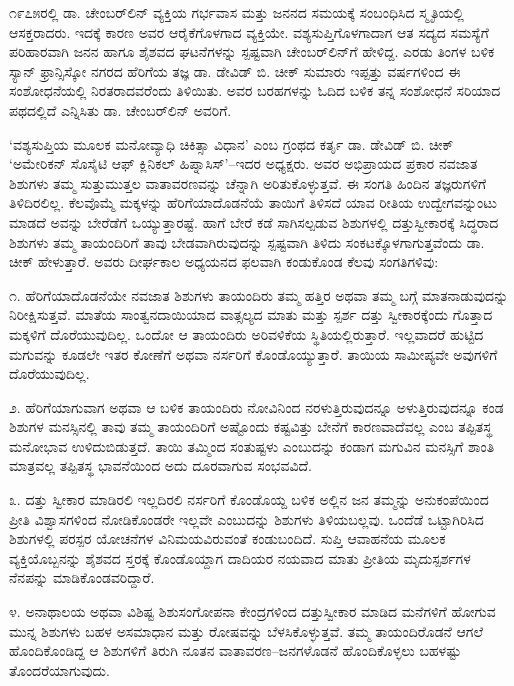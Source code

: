 ೧೯೭೫ರಲ್ಲಿ ಡಾ. ಚೇಂಬರ್​ಲಿನ್ ವ್ಯಕ್ತಿಯ ಗರ್ಭವಾಸ ಮತ್ತು ಜನನದ ಸಮಯಕ್ಕೆ ಸಂಬಂಧಿಸಿದ ಸ್ಮೃತಿಯಲ್ಲಿ ಆಸಕ್ತರಾದರು. ಇದಕ್ಕೆ ಕಾರಣ ಅವರ ಆರೈಕೆಗೊಳಗಾದ ವ್ಯಕ್ತಿಯೇ. ವಶ್ಯಸುಪ್ತಿಗೊಳಗಾದಾಗ ಆತ ಸದ್ಯದ ಸಮಸ್ಯೆಗೆ ಪರಿಹಾರವಾಗಿ ಜನನ ಹಾಗೂ ಶೈಶವದ ಘಟನೆಗಳನ್ನು ಸ್ಪಷ್ಟವಾಗಿ ಚೇಂಬರ್​ಲಿನ್​ಗೆ ಹೇಳಿದ್ದ. ಎರಡು ತಿಂಗಳ ಬಳಿಕ ಸ್ಯಾನ್ ಫ್ರಾನ್ಸಿಸ್ಕೋ ನಗರದ ಹೆರಿಗೆಯ ತಜ್ಞ ಡಾ. ಡೇವಿಡ್ ಬಿ. ಚೀಕ್ ಸುಮಾರು ಇಪ್ಪತ್ತು ವರ್ಷಗಳಿಂದ ಈ ಸಂಶೋಧನೆಯಲ್ಲಿ ನಿರತರಾದವರೆಂದು ತಿಳಿಯಿತು. ಅವರ ಬರಹಗಳನ್ನು ಓದಿದ ಬಳಿಕ ತನ್ನ ಸಂಶೋಧನೆ ಸರಿಯಾದ ಪಥದಲ್ಲಿದೆ ಎನ್ನಿಸಿತು ಡಾ. ಚೇಂಬರ್​ಲಿನ್ ಅವರಿಗೆ.

‘ವಶ್ಯಸುಪ್ತಿಯ ಮೂಲಕ ಮನೋವ್ಯಾಧಿ ಚಿಕಿತ್ಸಾ ವಿಧಾನ’ ಎಂಬ ಗ್ರಂಥದ ಕರ್ತೃ ಡಾ. ಡೇವಿಡ್ ಬಿ. ಚೀಕ್ ‘ಅಮೇರಿಕನ್ ಸೊಸೈಟಿ ಆಫ್ ಕ್ಲಿನಿಕಲ್ ಹಿಪ್ನಾಸಿಸ್​’–ಇದರ ಅಧ್ಯಕ್ಷರು. ಅವರ ಅಭಿಪ್ರಾಯದ ಪ್ರಕಾರ ನವಜಾತ ಶಿಶುಗಳು ತಮ್ಮ ಸುತ್ತುಮುತ್ತಲ ವಾತಾವರಣವನ್ನು ಚೆನ್ನಾಗಿ ಅರಿತುಕೊಳ್ಳುತ್ತವೆ. ಈ ಸಂಗತಿ ಹಿಂದಿನ ತಜ್ಞರುಗಳಿಗೆ ತಿಳಿದಿರಲಿಲ್ಲ. ಕೆಲವೊಮ್ಮೆ ಮಕ್ಕಳನ್ನು ಹೆರಿಗೆಯಾದೊಡನೆಯೆ ತಾಯಿಗೆ ತಿಳಿಸದೆ ಯಾವ ರೀತಿಯ ಉದ್ವೇಗವನ್ನುಂಟು ಮಾಡದೆ ಅವನ್ನು ಬೇರೆಡೆಗೆ ಒಯ್ಯುತ್ತಾರಷ್ಟೆ. ಹಾಗೆ ಬೇರೆ ಕಡೆ ಸಾಗಿಸಲ್ಪಡುವ ಶಿಶುಗಳಲ್ಲಿ ದತ್ತುಸ್ವೀಕಾರಕ್ಕೆ ಸಿದ್ಧರಾದ ಶಿಶುಗಳು ತಮ್ಮ ತಾಯಂದಿರಿಗೆ ತಾವು ಬೇಡವಾಗಿರುವುದನ್ನು ಸ್ಪಷ್ಟವಾಗಿ ತಿಳಿದು ಸಂಕಟಕ್ಕೊಳಗಾಗುತ್ತವೆಂದು ಡಾ. ಚೀಕ್ ಹೇಳುತ್ತಾರೆ. ಅವರು ದೀರ್ಘಕಾಲ ಅಧ್ಯಯನದ ಫಲವಾಗಿ ಕಂಡುಕೊಂಡ ಕೆಲವು ಸಂಗತಿಗಳಿವು:

೧. ಹೆರಿಗೆಯಾದೊಡನೆಯೇ ನವಜಾತ ಶಿಶುಗಳು ತಾಯಂದಿರು ತಮ್ಮ ಹತ್ತಿರ ಅಥವಾ ತಮ್ಮ ಬಗ್ಗೆ ಮಾತನಾಡುವುದನ್ನು ನಿರೀಕ್ಷಿಸುತ್ತವೆ. ಮಾತೆಯ ಸಾಂತ್ವನದಾಯಿಯಾದ ವಾತ್ಸಲ್ಯದ ಮಾತು ಮತ್ತು ಸ್ಪರ್ಶ ದತ್ತು ಸ್ವೀಕಾರಕ್ಕೆಂದು ಗೊತ್ತಾದ ಮಕ್ಕಳಿಗೆ ದೊರೆಯುವುದಿಲ್ಲ. ಒಂದೋ ಆ ತಾಯಂದಿರು ಅರಿವಳಿಕೆಯ ಸ್ಥಿತಿಯಲ್ಲಿರುತ್ತಾರೆ. ಇಲ್ಲವಾದರೆ ಹುಟ್ಟಿದ ಮಗುವನ್ನು ಕೂಡಲೇ ಇತರ ಕೋಣೆಗೆ ಅಥವಾ ನರ್ಸರಿಗೆ ಕೊಂಡೊಯ್ಯುತ್ತಾರೆ. ತಾಯಿಯ ಸಾಮೀಪ್ಯವೇ ಅವುಗಳಿಗೆ ದೊರೆಯುವುದಿಲ್ಲ.

೨. ಹೆರಿಗೆಯಾಗುವಾಗ ಅಥವಾ ಆ ಬಳಿಕ ತಾಯಂದಿರು ನೋವಿನಿಂದ ನರಳುತ್ತಿರುವುದನ್ನೂ ಅಳುತ್ತಿರುವುದನ್ನೂ ಕಂಡ ಶಿಶುಗಳ ಮನಸ್ಸಿನಲ್ಲಿ ತಾವು ತಮ್ಮ ತಾಯಂದಿರಿಗೆ ಅಷ್ಟೊಂದು ಕಷ್ಟವಿತ್ತು ಬೇನೆಗೆ ಕಾರಣವಾದೆವಲ್ಲ ಎಂಬ ತಪ್ಪಿತಸ್ಥ ಮನೋಭಾವ ಉಳಿದುಬಿಡುತ್ತದೆ. ತಾಯಿ ತಮ್ಮಿಂದ ಸಂತುಷ್ಟಳು ಎಂಬುದನ್ನು ಕಂಡಾಗ ಮಗುವಿನ ಮನಸ್ಸಿಗೆ ಶಾಂತಿ ಮಾತ್ರವಲ್ಲ ತಪ್ಪಿತಸ್ಥ ಭಾವನೆಯಿಂದ ಅದು ದೂರವಾಗುವ ಸಂಭವವಿದೆ.

೩. ದತ್ತು ಸ್ವೀಕಾರ ಮಾಡಿರಲಿ ಇಲ್ಲದಿರಲಿ ನರ್ಸರಿಗೆ ಕೊಂಡೊಯ್ದ ಬಳಿಕ ಅಲ್ಲಿನ ಜನ ತಮ್ಮನ್ನು ಅನುಕಂಪೆಯಿಂದ ಪ್ರೀತಿ ವಿಶ್ವಾಸಗಳಿಂದ ನೋಡಿಕೊಂಡರೇ ಇಲ್ಲವೇ ಎಂಬುದನ್ನು ಶಿಶುಗಳು ತಿಳಿಯಬಲ್ಲವು. ಒಂದೆಡೆ ಒಟ್ಟಾಗಿರಿಸಿದ ಶಿಶುಗಳಲ್ಲಿ ಪರಸ್ಪರ ಯೋಚನೆಗಳ ವಿನಿಮಯವಿರುವಂತೆ ಕಂಡುಬಂದಿದೆ. ಸುಪ್ತಿ ಆವಾಹನೆಯ ಮೂಲಕ ವ್ಯಕ್ತಿಯೊಬ್ಬನನ್ನು ಶೈಶವದ ಸ್ತರಕ್ಕೆ ಕೊಂಡೊಯ್ದಾಗ ದಾದಿಯರ ನಯವಾದ ಮಾತು ಪ್ರೀತಿಯ ಮೃದುಸ್ಪರ್ಶಗಳ ನೆನಪನ್ನು ಮಾಡಿಕೊಂಡವರಿದ್ದಾರೆ.

೪. ಅನಾಥಾಲಯ ಅಥವಾ ವಿಶಿಷ್ಟ ಶಿಶುಸಂಗೋಪನಾ ಕೇಂದ್ರಗಳಿಂದ ದತ್ತುಸ್ವೀಕಾರ ಮಾಡಿದ ಮನೆಗಳಿಗೆ ಹೋಗುವ ಮುನ್ನ ಶಿಶುಗಳು ಬಹಳ ಅಸಮಾಧಾನ ಮತ್ತು ರೋಷವನ್ನು ಬೆಳಸಿಕೊಳ್ಳುತ್ತವೆ. ತಮ್ಮ ತಾಯಂದಿರೊಡನೆ ಆಗಲೆ ಹೊಂದಿಕೊಂಡಿದ್ದ ಆ ಶಿಶುಗಳಿಗೆ ತಿರುಗಿ ನೂತನ ವಾತಾವರಣ–ಜನಗಳೊಡನೆ ಹೊಂದಿಕೊಳ್ಳಲು ಬಹಳಷ್ಟು ತೊಂದರೆಯಾಗುವುದು.

